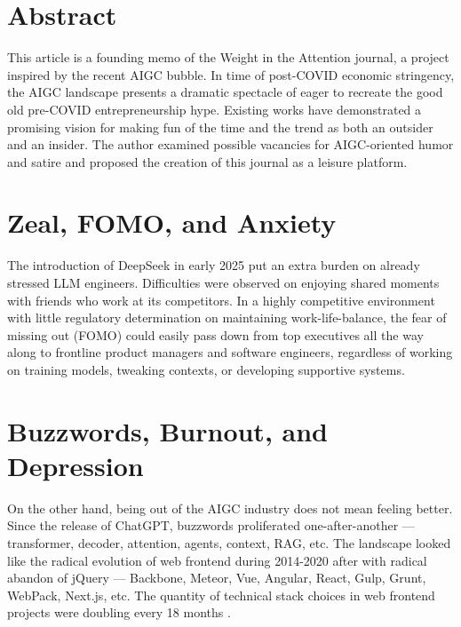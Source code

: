 




\section*{Abstract}
This article is a founding memo of the Weight in the Attention journal, a project inspired by the recent AIGC bubble.
In time of post-COVID economic stringency, the AIGC landscape presents a dramatic spectacle
of eager to recreate the good old pre-COVID entrepreneurship hype.
Existing works \cite{agibar} have demonstrated a promising vision
for making fun of the time and the trend as both an outsider and an insider.
The author examined possible vacancies for AIGC-oriented humor and satire and proposed
the creation of this journal as a leisure platform.



\section{Zeal, FOMO, and Anxiety}
The introduction of DeepSeek in early 2025 put an extra burden \cite{tonypengds}
on already stressed LLM engineers.
Difficulties were observed on enjoying shared moments with friends who work at its competitors.
In a highly competitive environment with little regulatory determination on maintaining work-life-balance,
the fear of missing out (FOMO) could easily pass down from top executives all the way along to
frontline product managers and software engineers,
regardless of working on training models, tweaking contexts, or developing supportive systems.



\section{Buzzwords, Burnout, and Depression}
On the other hand, being out of the AIGC industry does not mean feeling better.
Since the release of ChatGPT, buzzwords proliferated one-after-another ---
transformer, decoder, attention, agents, context, RAG, etc.
The landscape looked like the radical evolution of web frontend during 2014-2020 after with radical abandon of jQuery ---
Backbone, Meteor, Vue, Angular, React, Gulp, Grunt, WebPack, Next.js, etc.
The quantity of technical stack choices in web frontend projects were doubling every 18 months \cite{Moore1965}.

